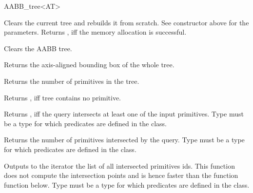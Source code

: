 \begin{ccRefClass}{AABB_tree<AT>}
\ccOperations

{Clears the current tree and rebuilds it from scratch. See constructor above for the parameters. Returns , iff the memory allocation is successful. }

{Clears the AABB tree. }

{Returns the axis-aligned bounding box of the whole tree. }

{Returns the number of primitives in the tree. }

{Returns , iff tree contains no primitive. }


{Returns , iff the query intersects at least one of the input primitives. Type  must be a type for which  predicates are defined in the  class.}
	
{Returns the number of primitives intersected by the query. Type  must be a type for which  predicates are defined in the  class.}


{Outputs to the iterator the list of all intersected primitives ids. This function does not compute the intersection points and is hence faster than the function  function below. Type  must be a type for which  predicates are defined in the  class.}


\end{ccRefClass}
